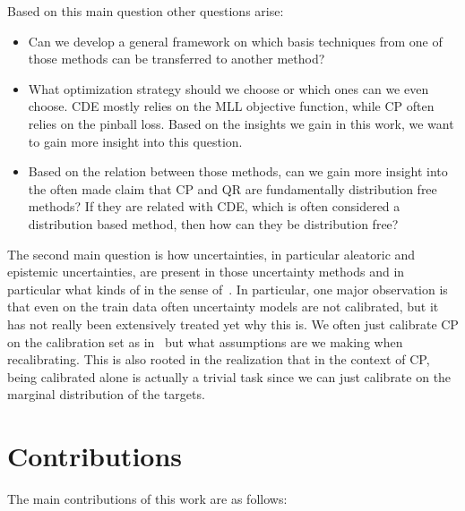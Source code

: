 Based on this main question other questions arise:

\begin{itemize}
    \item Can we develop a general framework on which basis techniques from one of those methods can be transferred to another method?
    \item What optimization strategy should we choose or which ones can we even choose. CDE mostly relies on the MLL objective function, while CP often relies on the pinball loss. Based on the insights we gain in this work, we want to gain more insight into this question.
    \item Based on the relation between those methods, can we gain more insight into the often made claim that CP and QR are fundamentally distribution free methods? If they are related with CDE, which is often considered a distribution based method, then how can they be distribution free?
\end{itemize}

The second main question is how uncertainties, in particular aleatoric and epistemic uncertainties, are present in those uncertainty methods and in particular what kinds of in the sense of~\cite{hullermeier_aleatoric_2021}. In particular, one major observation is that even on the train data often uncertainty models are not calibrated, but it has not really been extensively treated yet why this is. We often just calibrate CP on the calibration set as in~\cite{sesia2021conformal} but what assumptions are we making when recalibrating. This is also rooted in the realization that in the context of CP, being calibrated alone is actually a trivial task since we can just calibrate on the marginal distribution of the targets.

\section{Contributions}\label{sec:contributions}

The main contributions of this work are as follows:

